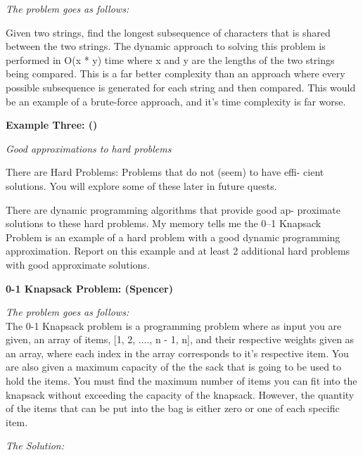 \documentclass{article}
\begin{document}
\noindent \textit{The problem goes as follows:}

Given two strings, find the longest subsequence of characters that is 
shared between the two strings. The dynamic approach to solving this problem
is performed in O(x * y) time where x and y are the lengths of the two 
strings being compared. This is a far better complexity than an approach 
where every possible subsequence is generated for each string and then 
compared. This would be an example of a brute-force approach, and it's time 
complexity is far worse.

\bigskip

\noindent \textbf{Example Three: ()}




\pagebreak

\noindent \textit{Good approximations to hard problems}

\medskip

There are Hard Problems: Problems that do not (seem) to have effi-
cient solutions. You will explore some of these later in future quests.

\medskip

There are dynamic programming algorithms that provide good ap-
proximate solutions to these hard problems. My memory tells me the
0–1 Knapsack Problem is an example of a hard problem with a good
dynamic programming approximation. Report on this example and
at least 2 additional hard problems with good approximate solutions.

\bigskip

\noindent \textbf{0-1 Knapsack Problem: (Spencer)} 

\noindent \textit{The problem goes as follows:} \\

The 0-1 Knapsack problem is a programming problem where as input you
are given, an array of items, [1, 2, ...., n - 1, n], and their 
respective weights given as an array, where each index in the array
corresponds to it's respective item. You are also given a maximum capacity
of the the sack that is going to be used to hold the items. You must find
the maximum number of items you can fit into the knapsack without exceeding
the capacity of the knapsack. However, the quantity of the items that can
be put into the bag is either zero or one of each specific item.

\medskip

\noindent \textit{The Solution:} \\
\end{document}
